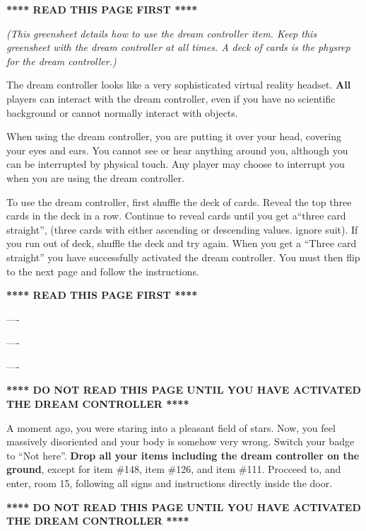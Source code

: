 \documentclass[green]{guildcamp1}
\begin{document}
\name{\gDreamController{}}

\textbf{**** READ THIS PAGE FIRST ****}

\emph{(This greensheet details how to use the dream controller item. Keep this greensheet with the dream controller at all times. A deck of cards is the physrep for the dream controller.)}

The dream controller looks like a very sophisticated virtual reality headset. \textbf{All} players can interact with the dream controller, even if you have no scientific background or cannot normally interact with objects.

When using the dream controller, you are putting it over your head, covering your eyes and ears. You cannot see or hear anything around you, although you can be interrupted by physical touch. Any player may choose to interrupt you when you are using the dream controller.

To use the dream controller, first shuffle the deck of cards. Reveal the top three cards in the deck in a row. Continue to reveal cards until you get a``three card straight'', (three cards with either ascending or descending values. ignore suit). If you run out of deck, shuffle the deck and try again. When you get a ``Three card straight'' you have successfully activated the dream controller.  You must then flip to the next page and follow the instructions.

\textbf{**** READ THIS PAGE FIRST ****}

----

----

----

\textbf{**** DO NOT READ THIS PAGE UNTIL YOU HAVE ACTIVATED THE DREAM CONTROLLER ****}

A moment ago, you were staring into a pleasant field of stars. Now, you feel massively disoriented and your body is somehow very wrong. Switch your badge to ``Not here''. \textbf{Drop all your items including the dream controller on the ground}, except for item \#148, item \#126, and item \#111. Procceed to, and enter, room 15, following all signs and instructions directly inside the door.

\textbf{**** DO NOT READ THIS PAGE UNTIL YOU HAVE ACTIVATED THE DREAM CONTROLLER ****}
\end{document}
